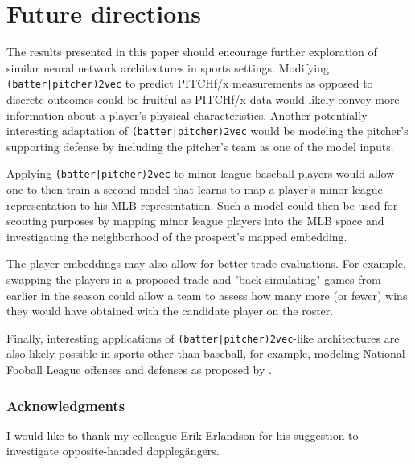 \documentclass{article}
\begin{document}
\section{Future directions}
\label{future}

The results presented in this paper should encourage further exploration of similar neural network architectures in sports settings. Modifying \texttt{(batter|pitcher)2vec} to predict PITCHf/x measurements as opposed to discrete outcomes could be fruitful as PITCHf/x data would likely convey more information about a player's physical characteristics. Another potentially interesting adaptation of \texttt{(batter|pitcher)2vec} would be modeling the pitcher's supporting defense by including the pitcher's team as one of the model inputs.

Applying \texttt{(batter|pitcher)2vec} to minor league baseball players would allow one to then train a second model that learns to map a player's minor league representation to his MLB representation. Such a model could then be used for scouting purposes by mapping minor league players into the MLB space and investigating the neighborhood of the prospect's mapped embedding.

The player embeddings may also allow for better trade evaluations. For example, swapping the players in a proposed trade and "back simulating" games from earlier in the season could allow a team to assess how many more (or fewer) wins they would have obtained with the candidate player on the roster.

Finally, interesting applications of \texttt{(batter|pitcher)2vec}-like architectures are also likely possible in sports other than baseball, for example, modeling National Fooball League offenses and defenses as proposed by \parencite{Alcorn2016}.

\subsubsection*{Acknowledgments}

I would like to thank my colleague Erik Erlandson for his suggestion to investigate opposite-handed dopplegängers.

\printbibliography
\end{document}
